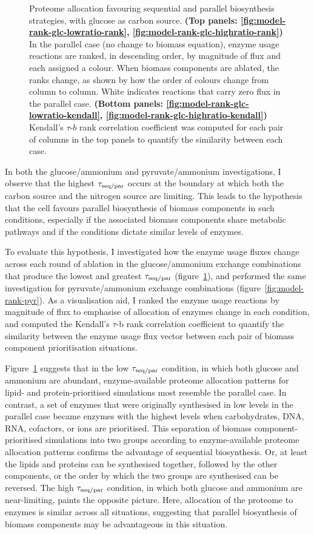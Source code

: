 \begin{figure}
  \caption{
    Proteome allocation favouring sequential and parallel biosynthesis strategies, with glucose as carbon source.
    \textbf{(Top panels: \ref{fig:model-rank-glc-lowratio-rank}, \ref{fig:model-rank-glc-highratio-rank})} In the parallel case (no change to biomass equation), enzyme usage reactions are ranked, in descending order, by magnitude of flux and each assigned a colour.
    When biomass components are ablated, the ranks change, as shown by how the order of colours change from column to column.
    White indicates reactions that carry zero flux in the parallel case.
    \textbf{(Bottom panels: \ref{fig:model-rank-glc-lowratio-kendall}, \ref{fig:model-rank-glc-highratio-kendall})} Kendall's $\tau$-$b$ rank correlation coefficient was computed for each pair of columns in the top panels to quantify the similarity between each case.
  }
  \label{fig:model-rank-glc}
\end{figure}

In both the glucose/ammonium and pyruvate/ammonium investigations, I observe that the highest $\tau_{\mathrm{seq}/\mathrm{par}}$ occurs at the boundary at which both the carbon source and the nitrogen source are limiting.
This leads to the hypothesis that the cell favours parallel biosynthesis of biomass components in such conditions, especially if the associated biomass components share metabolic pathways and if the conditions dictate similar levels of enzymes.

To evaluate this hypothesis, I investigated how the enzyme usage fluxes change across each round of ablation in the glucose/ammonium exchange combinations that produce the lowest and greatest $\tau_{\mathrm{seq}/\mathrm{par}}$ (figure~\ref{fig:model-rank-glc}), and performed the same investigation for pyruvate/ammonium exchange combinations (figure~\ref{fig:model-rank-pyr}).
As a visualisation aid, I ranked the enzyme usage reactions by magnitude of flux to emphasise of allocation of enzymes change in each condition, and computed the Kendall's $\tau$-b rank correlation coefficient to quantify the similarity between the enzyme usage flux vector between each pair of biomass component prioritisation situations.

Figure~\ref{fig:model-rank-glc} suggests that in the low $\tau_{\mathrm{seq}/\mathrm{par}}$ condition, in which both glucose and ammonium are abundant, enzyme-available proteome allocation patterns for lipid- and protein-prioritised simulations most resemble the parallel case.
In contrast, a set of enzymes that were originally synthesised in low levels in the parallel case became enzymes with the highest levels when carbohydrates, DNA, RNA, cofactors, or ions are prioritised.
This separation of biomass component-prioritised simulations into two groups according to enzyme-available proteome allocation patterns confirms the advantage of sequential biosynthesis.
Or, at least the lipids and proteins can be synthesised together, followed by the other components, or the order by which the two groups are synthesised can be reversed.
The high $\tau_{\mathrm{seq}/\mathrm{par}}$ condition, in which both glucose and ammonium are near-limiting, paints the opposite picture.
Here, allocation of the proteome to enzymes is similar across all situations, suggesting that parallel biosynthesis of biomass components may be advantageous in this situation.

